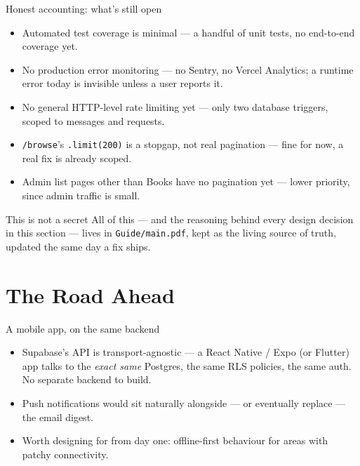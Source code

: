 \documentclass[aspectratio=169,11pt]{beamer}
\newcommand{\code}[1]{\textcolor{olkTealDark}{\texttt{#1}}}
\begin{document}
\begin{frame}{Honest accounting: what's still open}
  \begin{itemize}
    \item Automated test coverage is minimal --- a handful of unit tests, no end-to-end coverage yet.
    \item No production error monitoring --- no Sentry, no Vercel Analytics; a runtime error today is invisible unless a user reports it.
    \item No general HTTP-level rate limiting yet --- only two database triggers, scoped to messages and requests.
    \item \code{/browse}'s \code{.limit(200)} is a stopgap, not real pagination --- fine for now, a real fix is already scoped.
    \item Admin list pages other than Books have no pagination yet --- lower priority, since admin traffic is small.
  \end{itemize}
  \vfill
  \begin{block}{This is not a secret}
    All of this --- and the reasoning behind every design decision in this section --- lives in \code{Guide/main.pdf}, kept as the living source of truth, updated the same day a fix ships.
  \end{block}
\end{frame}

\section{The Road Ahead}

\begin{frame}{A mobile app, on the same backend}
  \begin{itemize}
    \item Supabase's API is transport-agnostic --- a React Native / Expo (or Flutter) app talks to the \emph{exact same} Postgres, the same RLS policies, the same auth. No separate backend to build.
    \item Push notifications would sit naturally alongside --- or eventually replace --- the email digest.
    \item Worth designing for from day one: offline-first behaviour for areas with patchy connectivity.
  \end{itemize}
\end{frame}
\end{document}
